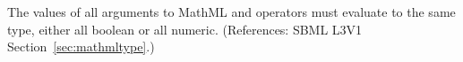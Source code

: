 The values of all arguments to MathML  and  operators
must evaluate to the same type, either all boolean or all numeric.
(References: SBML L3V1 Section~\ref{sec:mathmltype}.)
